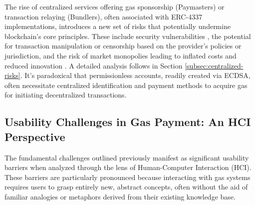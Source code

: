 \documentclass[preprint,12pt]{elsarticle}
\begin{document}
The rise of centralized services offering gas sponsorship (Paymasters) or transaction relaying (Bundlers), often associated with ERC-4337 implementations, introduces a new set of risks that potentially undermine blockchain's core principles. These include security vulnerabilities \cite{liang2023,daian2020}, the potential for transaction manipulation or censorship based on the provider's policies or jurisdiction, and the risk of market monopolies leading to inflated costs and reduced innovation \cite{daian2020}. A detailed analysis follows in Section \ref{subsec:centralized-risks}. It's paradoxical that permissionless accounts, readily created via ECDSA, often necessitate centralized identification and payment methods to acquire gas for initiating decentralized transactions.

\subsection{Usability Challenges in Gas Payment: An HCI Perspective}
\label{subsec:usability-challenges}

The fundamental challenges outlined previously manifest as significant usability barriers when analyzed through the lens of Human-Computer Interaction (HCI)\cite{frohlich2022,saldivar2023,krug2009,glomann2019}. These barriers are particularly pronounced because interacting with gas systems requires users to grasp entirely new, abstract concepts, often without the aid of familiar analogies or metaphors derived from their existing knowledge base.
\end{document}
